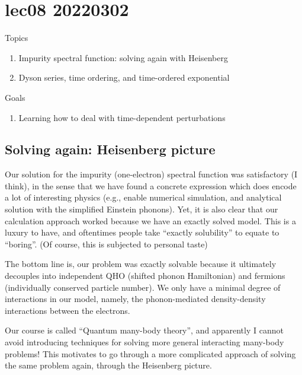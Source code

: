 \chapter{lec08 20220302}

Topics

\begin{enumerate}
    \item Impurity spectral function: solving again with Heisenberg
    \item Dyson series, time ordering, and time-ordered exponential
\end{enumerate}

Goals

\begin{enumerate}
    \item Learning how to deal with time-dependent perturbations
\end{enumerate}

\section{Solving again: Heisenberg picture}

Our solution for the impurity (one-electron) spectral function was satisfactory (I think), in the sense that we have found a concrete expression which does encode a lot of interesting physics (e.g., enable numerical simulation, and analytical solution with the simplified Einstein phonons). Yet, it is also clear that our calculation approach worked because we have an exactly solved model. This is a luxury to have, and oftentimes people take ``exactly solubility'' to equate to ``boring''. (Of course, this is subjected to personal taste)

The bottom line is, our problem was exactly solvable because it ultimately decouples into independent QHO (shifted phonon Hamiltonian) and fermions (individually conserved particle number). We only have a minimal degree of interactions in our model, namely, the phonon-mediated density-density interactions between the electrons.

Our course is called ``Quantum many-body theory'', and apparently I cannot avoid introducing techniques for solving more general interacting many-body problems! This motivates to go through a more complicated approach of solving the same problem again, through the Heisenberg picture.

